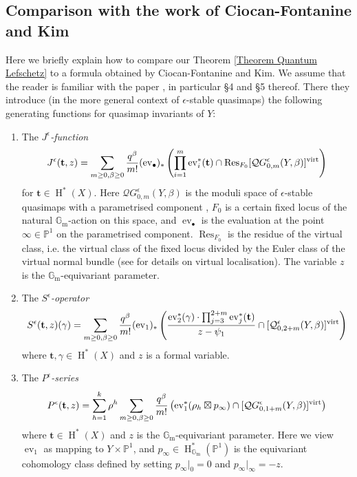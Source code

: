 \documentclass[10pt]{amsart}
\newcommand{\Qe}[4]{\mathcal{Q}^{\epsilon}_{#1,#2}(#3,#4)}
\newcommand{\QGe}[4]{\mathcal{Q}G^{\epsilon}_{#1,#2}(#3,#4)}
\newcommand{\PP}{\mathbb P}
\newcommand{\Gm}{\mathbb{G}_{\text{m}}}
\newcommand{\virt}[1]{[#1]^{\operatorname{virt}}}
\newcommand{\HH}{\operatorname{H}}
\newcommand{\ev}{\operatorname{ev}}
\theoremstyle{definition}
\theoremstyle{definition}
\begin{document}
\subsection{Comparison with the work of Ciocan-Fontanine and Kim} \label{Subsection CFK comparison}
Here we briefly explain how to compare our Theorem \ref{Theorem Quantum Lefschetz} to a formula obtained by Ciocan-Fontanine and Kim. We assume that the reader is familiar with the paper \cite{CF-K-wallcrossing}, in particular \S4 and \S5 thereof. There they introduce (in the more general context of $\epsilon$-stable quasimaps) the following generating functions for quasimap invariants of $Y$:
\begin{enumerate}
\item The \emph{$J^{\epsilon}$-function}
\begin{equation*} J^\epsilon({\bf t}, z)=\sum_{m\geq 0,\beta\geq 0} \dfrac{q^\beta}{m!} (\ev_\bullet)_*\left( \prod_{i=1}^m \ev_i^*({\bf t}) \cap\operatorname{Res}_{F_0} \virt{\QGe{0}{m}{Y}{\beta}} \right) \end{equation*}
for $\mathbf{t} \in \HH^*(X)$. Here $\QGe{0}{m}{Y}{\beta}$ is the moduli space of $\epsilon$-stable quasimaps with a parametrised component \cite[\S 7.2]{CFKM}, $F_0$ is a certain fixed locus of the natural $\Gm$-action on this space, and $\ev_\bullet$ is the evaluation at the point $\infty \in \PP^1$ on the parametrised component. $\operatorname{Res}_{F_0}$ is the residue of the virtual class, i.e. the virtual class of the fixed locus divided by the Euler class of the virtual normal bundle (see \cite{GraberPandharipande} for details on virtual localisation). The variable $z$ is the $\Gm$-equivariant parameter.
\item The \emph{$S^\epsilon$-operator}
\begin{equation*}
 S^\epsilon(\mathbf{t},z)(\gamma)=\sum_{m\ge 0,\beta\ge 0}\frac{q^\beta}{m!} 
(\ev_1)_*\left( \dfrac{\ev_2^*(\gamma) \cdot \prod_{j=3}^{2+m} \ev_j^*({\bf t})}{z-\psi_1} \cap\virt{\Qe{0}{2+m}{Y}{\beta}} \right)
\end{equation*}
where $\mathbf{t}, \gamma \in \HH^*(X)$ and $z$ is a formal variable.
\item The \emph{$P^\epsilon$-series}
\begin{equation*}
 P^\epsilon({\bf t}, z)=\sum_{h=1}^k \rho^h \sum_{m\geq 0,\beta\geq 0} \frac{q^\beta }{m!} \left( \ev_1^*(\rho_h \boxtimes p_\infty) \cap \virt{\QGe{0}{1+m}{Y}{\beta}} \right) \end{equation*}
where $\mathbf{t} \in \HH^*(X)$ and $z$ is the $\Gm$-equivariant parameter. Here we view $\ev_1$ as mapping to $Y \times \PP^1$, and $p_\infty\in \HH^*_{\Gm}(\PP^1)$ is the equivariant cohomology class defined by setting $p_{\infty}|_0 =0$ and $p_{\infty}|_{\infty}=-z$.
\end{enumerate}
\end{document}
